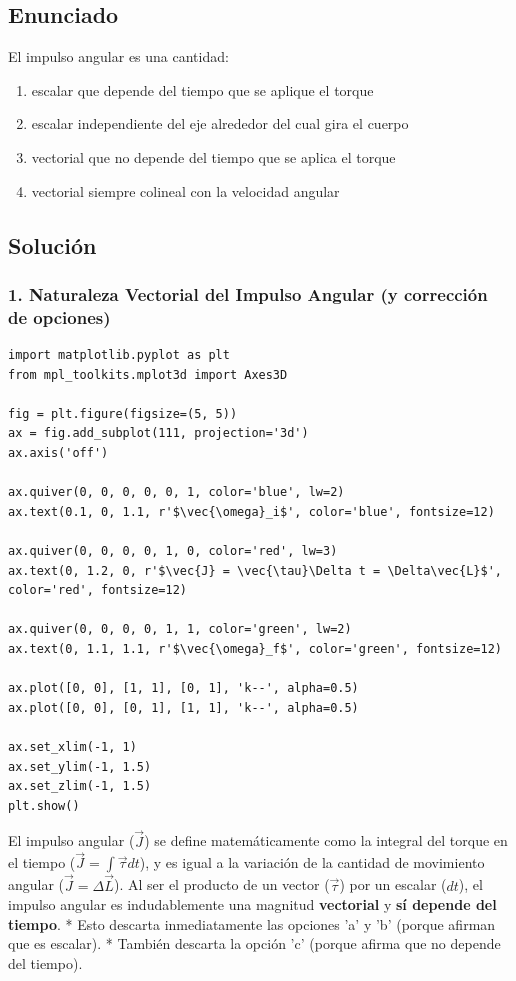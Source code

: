 \documentclass[12pt, a4paper]{article}
\begin{document}
\newpage

\subsection*{Enunciado}
El impulso angular es una cantidad:
\begin{enumerate}[label=\alph*)]
    \item escalar que depende del tiempo que se aplique el torque
    \item escalar independiente del eje alrededor del cual gira el cuerpo
    \item vectorial que no depende del tiempo que se aplica el torque
    \item vectorial siempre colineal con la velocidad angular
\end{enumerate}

\subsection*{Solución}

\subsubsection*{1. Naturaleza Vectorial del Impulso Angular (y corrección de opciones)}

\begin{verbatim}
import matplotlib.pyplot as plt
from mpl_toolkits.mplot3d import Axes3D

fig = plt.figure(figsize=(5, 5))
ax = fig.add_subplot(111, projection='3d')
ax.axis('off')

ax.quiver(0, 0, 0, 0, 0, 1, color='blue', lw=2)
ax.text(0.1, 0, 1.1, r'$\vec{\omega}_i$', color='blue', fontsize=12)

ax.quiver(0, 0, 0, 0, 1, 0, color='red', lw=3)
ax.text(0, 1.2, 0, r'$\vec{J} = \vec{\tau}\Delta t = \Delta\vec{L}$', color='red', fontsize=12)

ax.quiver(0, 0, 0, 0, 1, 1, color='green', lw=2)
ax.text(0, 1.1, 1.1, r'$\vec{\omega}_f$', color='green', fontsize=12)

ax.plot([0, 0], [1, 1], [0, 1], 'k--', alpha=0.5)
ax.plot([0, 0], [0, 1], [1, 1], 'k--', alpha=0.5)

ax.set_xlim(-1, 1)
ax.set_ylim(-1, 1.5)
ax.set_zlim(-1, 1.5)
plt.show()
\end{verbatim}

El impulso angular ($\vec{J}$) se define matemáticamente como la integral del torque en el tiempo ($\vec{J} = \int \vec{\tau} dt$), y es igual a la variación de la cantidad de movimiento angular ($\vec{J} = \Delta\vec{L}$).
Al ser el producto de un vector ($\vec{\tau}$) por un escalar ($dt$), el impulso angular es indudablemente una magnitud \textbf{vectorial} y \textbf{sí depende del tiempo}.
* Esto descarta inmediatamente las opciones 'a' y 'b' (porque afirman que es escalar).
* También descarta la opción 'c' (porque afirma que no depende del tiempo).
\end{document}
